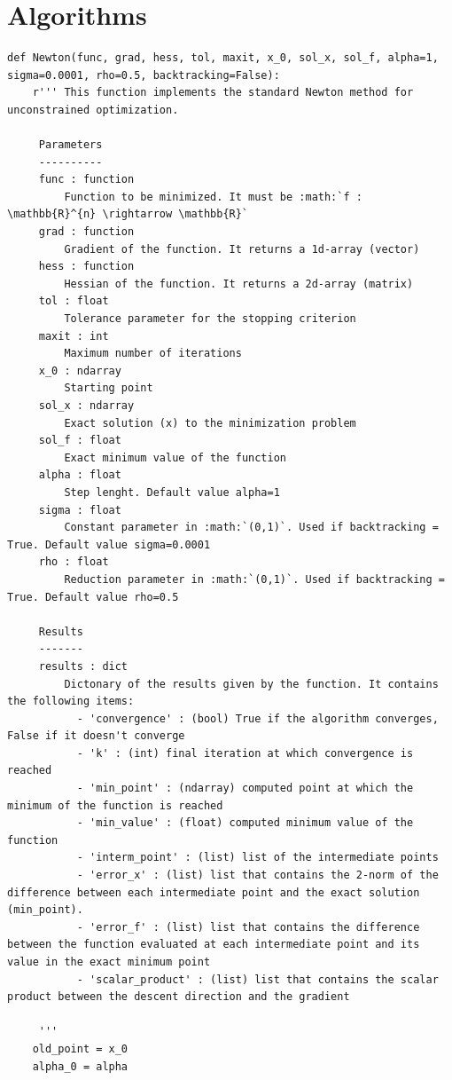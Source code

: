 \documentclass[a4paper,11pt]{article}
\begin{document}
\section{Algorithms}
\begin{verbatim}
def Newton(func, grad, hess, tol, maxit, x_0, sol_x, sol_f, alpha=1, sigma=0.0001, rho=0.5, backtracking=False):
    r''' This function implements the standard Newton method for unconstrained optimization.

     Parameters
     ----------
     func : function
         Function to be minimized. It must be :math:`f : \mathbb{R}^{n} \rightarrow \mathbb{R}`
     grad : function
         Gradient of the function. It returns a 1d-array (vector)
     hess : function
         Hessian of the function. It returns a 2d-array (matrix)
     tol : float
         Tolerance parameter for the stopping criterion
     maxit : int
         Maximum number of iterations
     x_0 : ndarray
         Starting point
     sol_x : ndarray
         Exact solution (x) to the minimization problem
     sol_f : float
         Exact minimum value of the function
     alpha : float
         Step lenght. Default value alpha=1
     sigma : float
         Constant parameter in :math:`(0,1)`. Used if backtracking = True. Default value sigma=0.0001
     rho : float
         Reduction parameter in :math:`(0,1)`. Used if backtracking = True. Default value rho=0.5

     Results
     -------
     results : dict
         Dictonary of the results given by the function. It contains the following items:
           - 'convergence' : (bool) True if the algorithm converges, False if it doesn't converge
           - 'k' : (int) final iteration at which convergence is reached
           - 'min_point' : (ndarray) computed point at which the minimum of the function is reached
           - 'min_value' : (float) computed minimum value of the function
           - 'interm_point' : (list) list of the intermediate points
           - 'error_x' : (list) list that contains the 2-norm of the difference between each intermediate point and the exact solution (min_point). 
           - 'error_f' : (list) list that contains the difference between the function evaluated at each intermediate point and its value in the exact minimum point
           - 'scalar_product' : (list) list that contains the scalar product between the descent direction and the gradient

     '''
    old_point = x_0
    alpha_0 = alpha


\end{verbatim}
\end{document}
